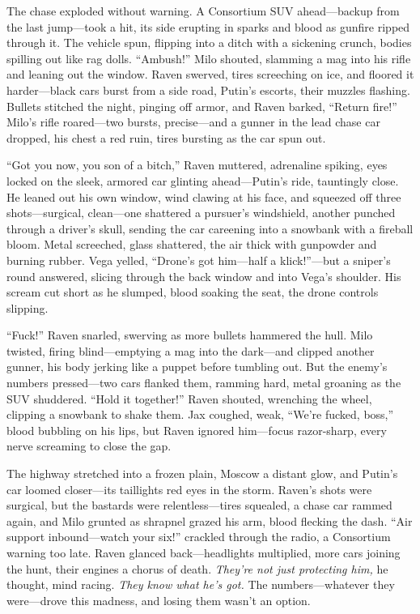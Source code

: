 \documentclass[12pt]{book}
\begin{document}
The chase exploded without warning. A Consortium SUV ahead—backup from the last jump—took a hit, its side erupting in sparks and blood as gunfire ripped through it. The vehicle spun, flipping into a ditch with a sickening crunch, bodies spilling out like rag dolls. “Ambush!” Milo shouted, slamming a mag into his rifle and leaning out the window. Raven swerved, tires screeching on ice, and floored it harder—black cars burst from a side road, Putin’s escorts, their muzzles flashing. Bullets stitched the night, pinging off armor, and Raven barked, “Return fire!” Milo’s rifle roared—two bursts, precise—and a gunner in the lead chase car dropped, his chest a red ruin, tires bursting as the car spun out.

“Got you now, you son of a bitch,” Raven muttered, adrenaline spiking, eyes locked on the sleek, armored car glinting ahead—Putin’s ride, tauntingly close. He leaned out his own window, wind clawing at his face, and squeezed off three shots—surgical, clean—one shattered a pursuer’s windshield, another punched through a driver’s skull, sending the car careening into a snowbank with a fireball bloom. Metal screeched, glass shattered, the air thick with gunpowder and burning rubber. Vega yelled, “Drone’s got him—half a klick!”—but a sniper’s round answered, slicing through the back window and into Vega’s shoulder. His scream cut short as he slumped, blood soaking the seat, the drone controls slipping.

“Fuck!” Raven snarled, swerving as more bullets hammered the hull. Milo twisted, firing blind—emptying a mag into the dark—and clipped another gunner, his body jerking like a puppet before tumbling out. But the enemy’s numbers pressed—two cars flanked them, ramming hard, metal groaning as the SUV shuddered. “Hold it together!” Raven shouted, wrenching the wheel, clipping a snowbank to shake them. Jax coughed, weak, “We’re fucked, boss,” blood bubbling on his lips, but Raven ignored him—focus razor-sharp, every nerve screaming to close the gap.

The highway stretched into a frozen plain, Moscow a distant glow, and Putin’s car loomed closer—its taillights red eyes in the storm. Raven’s shots were surgical, but the bastards were relentless—tires squealed, a chase car rammed again, and Milo grunted as shrapnel grazed his arm, blood flecking the dash. “Air support inbound—watch your six!” crackled through the radio, a Consortium warning too late. Raven glanced back—headlights multiplied, more cars joining the hunt, their engines a chorus of death. \textit{They’re not just protecting him,} he thought, mind racing. \textit{They know what he’s got.} The numbers—whatever they were—drove this madness, and losing them wasn’t an option.
\end{document}
